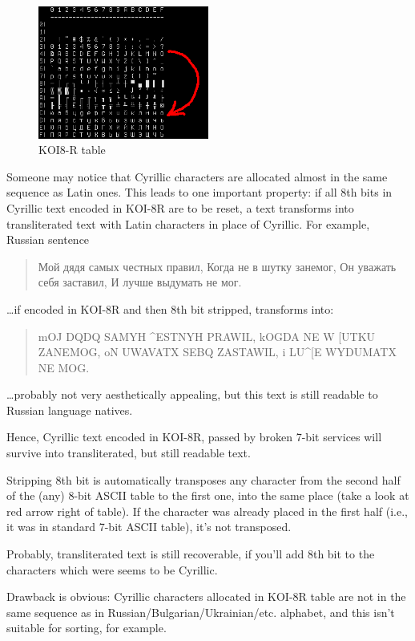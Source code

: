 \begin{figure}[H]
\centering
\includegraphics[width=0.5\textwidth]{fundamentals/koi8r.png}
\caption{KOI8-R table}
\end{figure}

Someone may notice that Cyrillic characters are allocated almost in the same sequence as Latin ones.
This leads to one important property: if all 8th bits in Cyrillic text encoded in KOI-8R are to be reset,
a text transforms into transliterated text with Latin characters in place of Cyrillic.
For example, Russian sentence

\begin{framed}
\begin{quotation}
Мой дядя самых честных правил, Когда не в шутку занемог, Он уважать себя заставил, И лучше выдумать не мог.
\end{quotation}
\end{framed}

\dots if encoded in KOI-8R and then 8th bit stripped, transforms into:

\begin{framed}
\begin{quotation}
mOJ DQDQ SAMYH \^{}ESTNYH PRAWIL, kOGDA NE W [UTKU ZANEMOG, oN UWAVATX SEBQ ZASTAWIL, i LU\^{}[E WYDUMATX NE MOG.
\end{quotation}
\end{framed}

\dots probably not very aesthetically appealing, but this text is still readable to Russian language natives.

Hence, Cyrillic text encoded in KOI-8R, passed by broken 7-bit services will survive into transliterated, but still
readable text.

Stripping 8th bit is automatically transposes any character from the second half of
the (any) 8-bit \ac{ASCII} table to the first one, into the same place (take a look at red arrow right of table).
If the character was already placed in the first half (i.e., it was in standard 7-bit \ac{ASCII} table), it's not transposed.

Probably, transliterated text is still recoverable, if you'll add 8th bit to the characters which were seems to be
Cyrillic.

Drawback is obvious: Cyrillic characters allocated in KOI-8R table are not in the same sequence as
in Russian/Bulgarian/Ukrainian/etc. alphabet, and this isn't suitable for sorting, for example.

